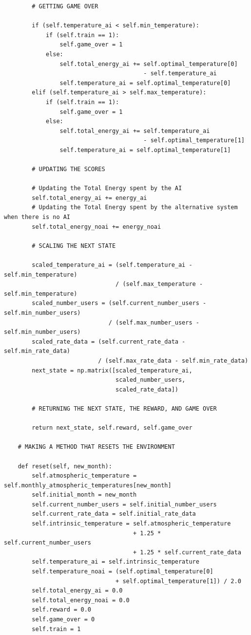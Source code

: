 \documentclass[]{book}
\begin{document}
\begin{lstlisting}
        # GETTING GAME OVER
        
        if (self.temperature_ai < self.min_temperature):
            if (self.train == 1):
                self.game_over = 1
            else:
                self.total_energy_ai += self.optimal_temperature[0]
                                        - self.temperature_ai
                self.temperature_ai = self.optimal_temperature[0]
        elif (self.temperature_ai > self.max_temperature):
            if (self.train == 1):
                self.game_over = 1
            else:
                self.total_energy_ai += self.temperature_ai
                                        - self.optimal_temperature[1]
                self.temperature_ai = self.optimal_temperature[1]
        
        # UPDATING THE SCORES
        
        # Updating the Total Energy spent by the AI
        self.total_energy_ai += energy_ai
        # Updating the Total Energy spent by the alternative system when there is no AI
        self.total_energy_noai += energy_noai
        
        # SCALING THE NEXT STATE
        
        scaled_temperature_ai = (self.temperature_ai - self.min_temperature)
                                / (self.max_temperature - self.min_temperature)
        scaled_number_users = (self.current_number_users - self.min_number_users)
                              / (self.max_number_users - self.min_number_users)
        scaled_rate_data = (self.current_rate_data - self.min_rate_data)
                           / (self.max_rate_data - self.min_rate_data)
        next_state = np.matrix([scaled_temperature_ai,
                                scaled_number_users,
                                scaled_rate_data])
        
        # RETURNING THE NEXT STATE, THE REWARD, AND GAME OVER
        
        return next_state, self.reward, self.game_over

    # MAKING A METHOD THAT RESETS THE ENVIRONMENT
    
    def reset(self, new_month):
        self.atmospheric_temperature = self.monthly_atmospheric_temperatures[new_month]
        self.initial_month = new_month
        self.current_number_users = self.initial_number_users
        self.current_rate_data = self.initial_rate_data
        self.intrinsic_temperature = self.atmospheric_temperature
                                     + 1.25 * self.current_number_users
                                     + 1.25 * self.current_rate_data
        self.temperature_ai = self.intrinsic_temperature
        self.temperature_noai = (self.optimal_temperature[0]
                                + self.optimal_temperature[1]) / 2.0
        self.total_energy_ai = 0.0
        self.total_energy_noai = 0.0
        self.reward = 0.0
        self.game_over = 0
        self.train = 1


\end{lstlisting}
\end{document}
